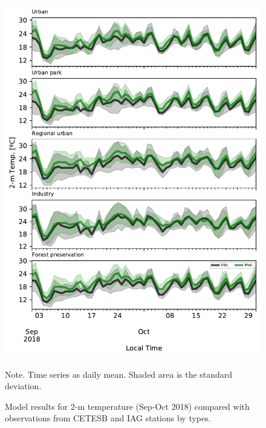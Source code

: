 \begin{figure}[hbt]
  \begin{center}
  	\includegraphics[width=.8\textwidth]{fig/temp_cetesb}
  \end{center}
  \caption{Model results for 2-m temperature (Sep-Oct 2018) compared with observations from CETESB and IAG stations by types.}
  {\scriptsize Note. Time series as daily mean. Shaded area is the standard deviation.}
  \label{fig:temp_cetesb}
\end{figure}

